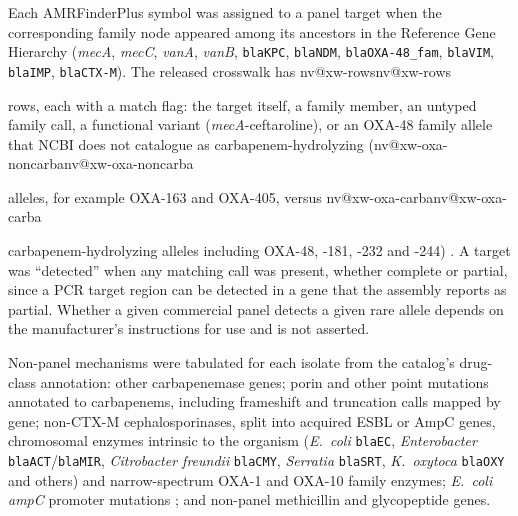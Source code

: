 \documentclass[10pt,twocolumn,letterpaper]{article}
\makeatletter
\newcommand{\nv}[1]{\ifcsname nv@#1\endcsname\csname nv@#1\endcsname\else
  \PackageError{numbers}{Unknown number key: #1}{Run build_assets.py}\fi}
\newcommand{\g}[1]{\textit{#1}}  %
\newcommand{\eco}{\textit{E.~coli}}
\makeatother
\begin{document}
Each AMRFinderPlus symbol was assigned to a panel target when the corresponding family node appeared among its ancestors
in the Reference Gene Hierarchy (\g{mecA}, \g{mecC}, \g{vanA}, \g{vanB}, \texttt{blaKPC}, \texttt{blaNDM},
\texttt{blaOXA-48\_fam}, \texttt{blaVIM}, \texttt{blaIMP}, \texttt{blaCTX-M}). The released crosswalk has \nv{xw-rows}
rows, each with a match flag: the target itself, a family member, an untyped family call, a functional variant
(\g{mecA}-ceftaroline), or an OXA-48 family allele that NCBI does not catalogue as carbapenem-hydrolyzing
(\nv{xw-oxa-noncarba} alleles, for example OXA-163 and OXA-405, versus \nv{xw-oxa-carba} carbapenem-hydrolyzing alleles
including OXA-48, -181, -232 and -244) \cite{poirel2012}. A target was ``detected'' when any matching call was present,
whether complete or partial, since a PCR target region can be detected in a gene that the assembly reports as partial.
Whether a given commercial panel detects a given rare allele depends on the manufacturer's instructions for use and is not
asserted.

Non-panel mechanisms were tabulated for each isolate from the catalog's drug-class annotation: other carbapenemase genes;
porin and other point mutations annotated to carbapenems, including frameshift and truncation calls mapped by gene;
non-CTX-M cephalosporinases, split into acquired ESBL or AmpC genes, chromosomal enzymes intrinsic to the organism
(\eco{} \texttt{blaEC}, \textit{Enterobacter} \texttt{blaACT}/\texttt{blaMIR}, \textit{Citrobacter freundii}
\texttt{blaCMY}, \textit{Serratia} \texttt{blaSRT}, \textit{K.~oxytoca} \texttt{blaOXY} and others) and narrow-spectrum
OXA-1 and OXA-10 family enzymes; \eco{} \g{ampC} promoter mutations \cite{caroff2000}; and non-panel methicillin and
glycopeptide genes.
\end{document}
